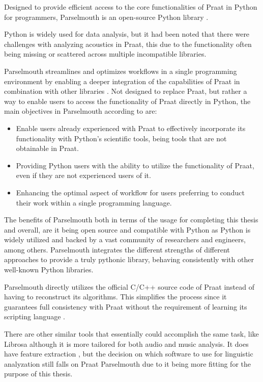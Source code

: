  

 

Designed to provide efficient access to the core functionalities of Praat in Python for programmers, Parselmouth is an open-source Python library \autocite{Jadoul2018}.

Python is widely used for data analysis, but it had been noted that there were challenges with analyzing acoustics in Praat, this due to the functionality often being missing or scattered across multiple incompatible libraries.

 Parselmouth streamlines and optimizes workflows in a single programming environment by enabling a deeper integration of the capabilities of Praat in combination with other libraries \autocite{Jadoul2024}. Not designed to replace Praat, but rather a way to enable users to access the functionality of Praat directly in Python, the main objectives in Parselmouth according to \autocite{Jadoul2018} are:

 \begin{itemize}
     \item Enable users already experienced with Praat to effectively incorporate its functionality with Python’s scientific tools, being tools that are not obtainable in Praat.
     \item Providing Python users with the ability to utilize the functionality of Praat, even if they are not experienced users of it.
     \item Enhancing the optimal aspect of workflow for users preferring to conduct their work within a single programming language.

 \end{itemize}
 
 The benefits of Parselmouth both in terms of the usage for completing this thesis and overall, are it being open source and compatible with Python as Python is widely utilized and backed by a vast community of researchers and engineers, among others. Parselmouth integrates the different strengths of different approaches to provide a truly pythonic library, behaving consistently with other well-known Python libraries.

Parselmouth directly utilizes the official C/C++ source code of Praat instead of having to reconstruct its algorithms. This simplifies the process since it guarantees full consistency with Praat without the requirement of learning its scripting language \autocite{Jadoul2018}.

There are other similar tools that essentially could accomplish the same task, like Librosa although it is more tailored for both audio and music analysis. It does have feature extraction \autocite{Babu2021}, but the decision on which software to use for linguistic analyzation still falls on Praat Parselmouth due to it being more fitting for the purpose of this thesis.

